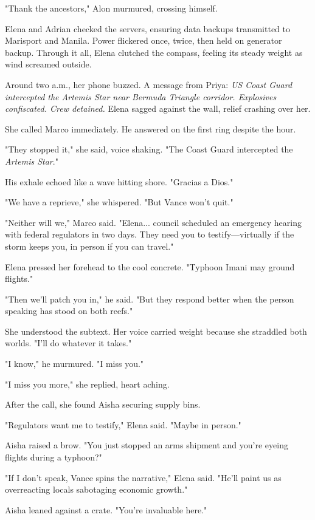 "Thank the ancestors," Alon murmured, crossing himself.

Elena and Adrian checked the servers, ensuring data backups transmitted to Marisport and Manila. Power flickered once, twice, then held on generator backup. Through it all, Elena clutched the compass, feeling its steady weight as wind screamed outside.

Around two a.m., her phone buzzed. A message from Priya: \textit{US Coast Guard intercepted the \textit{Artemis Star} near Bermuda Triangle corridor. Explosives confiscated. Crew detained.} Elena sagged against the wall, relief crashing over her.

She called Marco immediately. He answered on the first ring despite the hour.

"They stopped it," she said, voice shaking. "The Coast Guard intercepted the \textit{Artemis Star}."

His exhale echoed like a wave hitting shore. "Gracias a Dios."

"We have a reprieve," she whispered. "But Vance won't quit."

"Neither will we," Marco said. "Elena... council scheduled an emergency hearing with federal regulators in two days. They need you to testify—virtually if the storm keeps you, in person if you can travel."

Elena pressed her forehead to the cool concrete. "Typhoon Imani may ground flights."

"Then we'll patch you in," he said. "But they respond better when the person speaking has stood on both reefs."

She understood the subtext. Her voice carried weight because she straddled both worlds. "I'll do whatever it takes."

"I know," he murmured. "I miss you."

"I miss you more," she replied, heart aching.

After the call, she found Aisha securing supply bins.

"Regulators want me to testify," Elena said. "Maybe in person."

Aisha raised a brow. "You just stopped an arms shipment and you're eyeing flights during a typhoon?"

"If I don't speak, Vance spins the narrative," Elena said. "He'll paint us as overreacting locals sabotaging economic growth."

Aisha leaned against a crate. "You're invaluable here."

